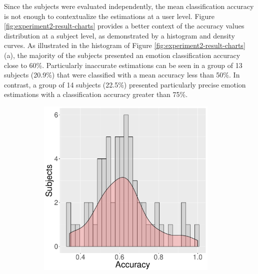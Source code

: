 Since the subjects were evaluated independently, the mean classification accuracy is not enough to contextualize the estimations at a user level. Figure \ref{fig:experiment2-result-charts} provides a better context of the accuracy values distribution at a subject level, as demonstrated by a histogram and density curves. As illustrated in the histogram of Figure \ref{fig:experiment2-result-charts}(a), the majority of the subjects presented an emotion classification accuracy close to 60\%. Particularly inaccurate estimations can be seen in a group of 13 subjects (20.9\%) that were classified with a mean accuracy less than 50\%. In contrast, a group of 14 subjects (22.5\%) presented particularly precise emotion estimations with a classification accuracy greater than 75\%.

\begin{figure}[ht]
\centering
  \begin{subfigure}[b]{0.5\textwidth}
    \includegraphics[width=0.95\textwidth]{Content/figures/experiment2-hist-user}
    \caption{}
    \label{fig:experiment2-chart-hist}
  \end{subfigure}%
  \begin{subfigure}[b]{0.5\textwidth}
    \centering

\end{subfigure}
\end{figure}
